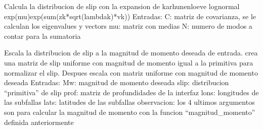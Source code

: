 \documentclass[letterpaper,10pt,english]{sphinxmanual}
\begin{document}

\begin{fulllineitems}
\label{\detokenize{main:main.distribucion_slip}}
\pysigstartsignatures
{}
\pysigstopsignatures
\sphinxAtStartPar
Calcula la distribucion de slip con la expansion de karhunen\sphinxhyphen{}loeve log\sphinxhyphen{}normal
exp(mu)exp(sum(zk*sqrt(lambdak)*vk))
Entradas: 
C: matriz de covarianza, se le calculan los eigenvalues y vectors
mu: matriz con medias
N: numero de modos a contar para la sumatoria

\end{fulllineitems}


\begin{fulllineitems}
\label{\detokenize{main:main.escalar_magnitud_momento}}
\pysigstartsignatures
{}
\pysigstopsignatures
\sphinxAtStartPar
Escala la distribucion de slip a la magnitud de momento deseada de entrada.
crea una matriz de slip uniforme con magnitud de momento igual a la primitiva
para normalizar el slip. Despues escala con matriz uniforme con magnitud de momento
deseada
Entradas:
Mw: magnitud de momento deseada
slip: distribucion “primitiva” de slip
prof: matriz de profundidades de la interfaz
lons: longitudes de las subfallas
lats: latitudes de las subfallas
observacion: los 4 ultimos argumentos son para calcular la magnitud de momento 
con la funcion “magnitud\_momento” definida anteriormente

\end{fulllineitems}

\end{document}
